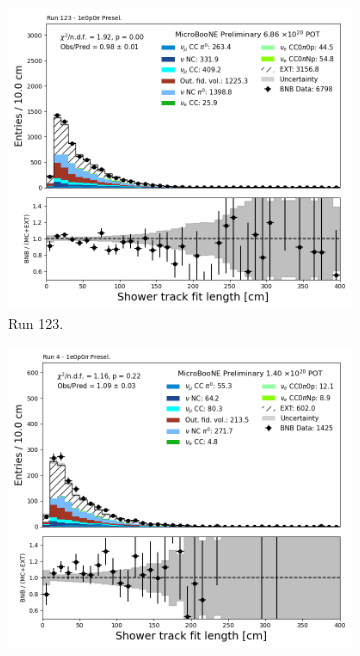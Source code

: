 \begin{figure}[H]
    \centering
    \begin{subfigure}[t]{0.32\linewidth}
        \includegraphics[width=\linewidth]{technote/Appendix_Preselection/Figures/1e0p0pi/Run123/shr_trk_len_Run123_1e0p0pi_Presel.png}
        \caption{Run 123.}
    \end{subfigure}%
    \hspace{0.2cm}%
    \begin{subfigure}[t]{0.32\linewidth}
        \includegraphics[width=\linewidth]{technote/Appendix_Preselection/Figures/1e0p0pi/Run4b/shr_trk_len_Run4b_1e0p0pi_Presel.png}

\end{subfigure}
\end{figure}

